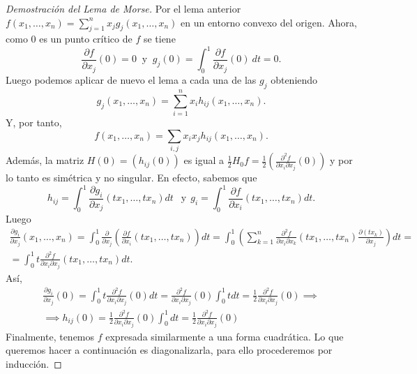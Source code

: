 \begin{proof}[Demostración del Lema de Morse]
    Por el lema anterior $f(x_1,\dots,x_n)=\sum_{j=1}^n x_jg_j(x_1,\dots,x_n)$ en un entorno convexo del origen. Ahora, como $0$ es un punto crítico de $f$ se tiene
    \begin{equation*}
        \frac{\partial f}{\partial x_j}(0)=0 ~\text{ y }~ g_j(0)=\int_0^1 \frac{\partial f}{\partial x_j}(0)~dt=0.
    \end{equation*}
    Luego podemos aplicar de nuevo el lema a cada una de las $g_j$ obteniendo
    \begin{equation*}
        g_j(x_1,\dots,x_n)=\sum_{i=1}^n x_ih_{ij}(x_1,\dots,x_n).
    \end{equation*}
    Y, por tanto,
    \begin{equation*}
        f(x_1,\dots,x_n)=\sum_{i,j} x_ix_jh_{ij}(x_1,\dots,x_n).
    \end{equation*}
    Además, la matriz $H(0)=(h_{ij}(0))$ es igual a $\frac{1}{2}H_0f=\frac{1}{2}(\frac{\partial^2f}{\partial x_i\partial x_j}(0))$ y por lo tanto es simétrica y no singular. En efecto, sabemos que 
    \begin{equation*}
        h_{ij}=\int_0^1 \frac{\partial g_i}{\partial x_j}(tx_1,\dots,tx_n)dt ~~\text{ y}~~ g_{i}=\int_0^1 \frac{\partial f}{\partial x_i}(tx_1,\dots,tx_n)dt.
    \end{equation*}
    Luego
    \begin{gather*}
        \frac{\partial g_i}{\partial x_j}(x_1,\dots,x_n)= \int_0^1 \frac{\partial}{\partial x_j}\left(\frac{\partial f}{\partial x_i}(tx_1,\dots,tx_n)\right)dt = \int_0^1 \left(\sum_{k=1}^n\frac{\partial^2 f}{\partial x_i \partial x_k}(tx_1,\dots,tx_n) \frac{\partial(tx_k)}{\partial x_j}\right)dt =\\
        = \int_0^1t\frac{\partial^2 f}{\partial x_i \partial x_j}(tx_1,\dots,tx_n)dt.
    \end{gather*}
    Así, 
    \begin{gather*}
        \frac{\partial g_i}{\partial x_j}(0)=\int_0^1 t\frac{\partial^2 f}{\partial x_i \partial x_j}(0)dt=\frac{\partial^2 f}{\partial x_i \partial x_j}(0)\int_0^1tdt= \frac{1}{2}\frac{\partial^2 f}{\partial x_i \partial x_j}(0)\implies\\
        \implies h_{ij}(0)=\frac{1}{2}\frac{\partial^2 f}{\partial x_i \partial x_j}(0)\int_0^1 dt =\frac{1}{2}\frac{\partial^2 f}{\partial x_i \partial x_j}(0)
    \end{gather*}
    Finalmente, tenemos $f$ expresada similarmente a una forma cuadrática. Lo que queremos hacer a continuación es diagonalizarla, para ello procederemos por inducción. 
    

\end{proof}
